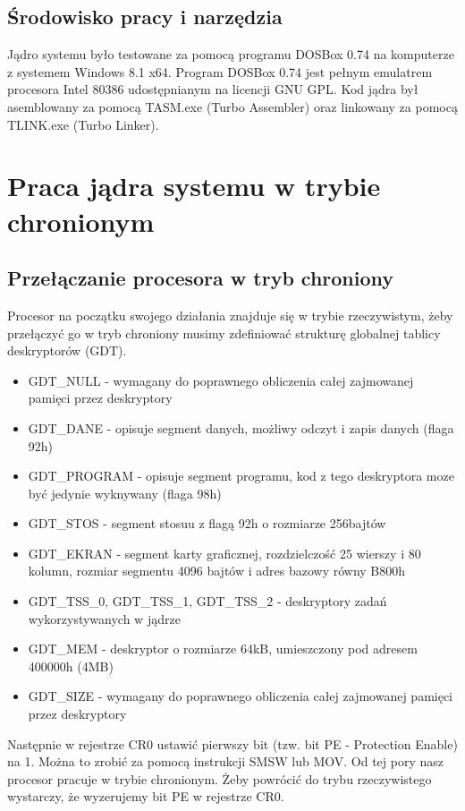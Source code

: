 \documentclass[a4paper,12pt]{article}
\begin{document}
	\subsection{Środowisko pracy i narzędzia}
	Jądro systemu było testowane za pomocą programu DOSBox 0.74 na komputerze z systemem Windows 8.1 x64. Program DOSBox 0.74 jest pełnym emulatrem procesora Intel 80386 udostępnianym na licencji GNU GPL. Kod jądra był asemblowany za pomocą TASM.exe (Turbo Assembler) oraz linkowany za pomocą TLINK.exe (Turbo Linker). 


	\section{Praca jądra systemu w trybie chronionym}


	\subsection{Przełączanie procesora w tryb chroniony}
Procesor na początku swojego działania znajduje się w trybie rzeczywistym, żeby przełączyć go w tryb chroniony musimy zdefiniować strukturę globalnej tablicy deskryptorów (GDT).

\begin{itemize}
\item{GDT\_NULL - wymagany do poprawnego obliczenia całej zajmowanej pamięci przez deskryptory}
\item{GDT\_DANE - opisuje segment danych, możliwy odczyt i zapis danych (flaga 92h)}
\item{GDT\_PROGRAM - opisuje segment programu, kod z tego deskryptora moze być jedynie wyknywany (flaga 98h)}
\item{GDT\_STOS - segment stosuu z flagą 92h o rozmiarze 256bajtów}
\item{GDT\_EKRAN - segment karty graficznej, rozdzielczość 25 wierszy i 80 kolumn, rozmiar segmentu 4096 bajtów i adres bazowy równy B800h}
\item{GDT\_TSS\_0, GDT\_TSS\_1, GDT\_TSS\_2 -  deskryptory zadań wykorzystywanych w jądrze}
\item{GDT\_MEM - deskryptor o rozmiarze 64kB, umieszczony pod adresem 400000h (4MB)}
\item{GDT\_SIZE - wymagany do poprawnego obliczenia całej zajmowanej pamięci przez deskryptory}

\end{itemize}

Następnie w rejestrze CR0 ustawić pierwszy bit (tzw. bit PE - Protection Enable) na 1. Można to zrobić za pomocą instrukcji SMSW lub MOV. Od tej pory nasz procesor pracuje w trybie chronionym. Żeby powrócić do trybu rzeczywistego wystarczy, że wyzerujemy bit PE w rejestrze CR0.
\end{document}
